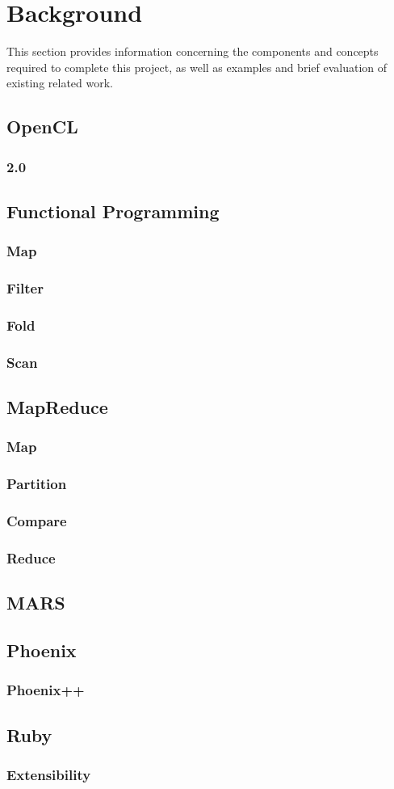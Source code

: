 \section{Background}
This section provides information concerning the components and concepts required to complete this project, as well as examples and brief evaluation of existing related work.
\subsection{OpenCL}
\subsubsection{2.0}
\subsection{Functional Programming}
\subsubsection{Map}
\subsubsection{Filter}
\subsubsection{Fold}
\subsubsection{Scan}
\subsection{MapReduce}
\subsubsection{Map}
\subsubsection{Partition}
\subsubsection{Compare}
\subsubsection{Reduce}
\subsection{MARS}
\subsection{Phoenix}
\subsubsection{Phoenix++}
\subsection{Ruby}
\subsubsection{Extensibility}
